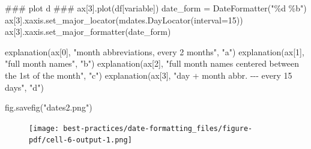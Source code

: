 \documentclass[
  letterpaper,
  DIV=11,
  numbers=noendperiod,
  oneside]{scrreprt}
\newenvironment{Shaded}{\begin{snugshade}}{\end{snugshade}}
\newcommand{\AlertTok}[1]{\textcolor[rgb]{0.68,0.00,0.00}{#1}}
\newcommand{\CommentTok}[1]{\textcolor[rgb]{0.37,0.37,0.37}{#1}}
\newcommand{\DecValTok}[1]{\textcolor[rgb]{0.68,0.00,0.00}{#1}}
\newcommand{\NormalTok}[1]{\textcolor[rgb]{0.00,0.23,0.31}{#1}}
\newcommand{\OperatorTok}[1]{\textcolor[rgb]{0.37,0.37,0.37}{#1}}
\newcommand{\SpecialCharTok}[1]{\textcolor[rgb]{0.37,0.37,0.37}{#1}}
\newcommand{\StringTok}[1]{\textcolor[rgb]{0.13,0.47,0.30}{#1}}
\begin{document}
\begin{Shaded}
\begin{Highlighting}[]
\CommentTok{\#\#\# plot d }\AlertTok{\#\#\#}
\NormalTok{ax[}\DecValTok{3}\NormalTok{].plot(df[}\StringTok{\textquotesingle{}variable\textquotesingle{}}\NormalTok{])}
\NormalTok{date\_form }\OperatorTok{=}\NormalTok{ DateFormatter(}\StringTok{"}\SpecialCharTok{\%d}\StringTok{ \%b"}\NormalTok{)}
\NormalTok{ax[}\DecValTok{3}\NormalTok{].xaxis.set\_major\_locator(mdates.DayLocator(interval}\OperatorTok{=}\DecValTok{15}\NormalTok{))}
\NormalTok{ax[}\DecValTok{3}\NormalTok{].xaxis.set\_major\_formatter(date\_form)}

\NormalTok{explanation(ax[}\DecValTok{0}\NormalTok{], }\StringTok{"month abbreviations, every 2 months"}\NormalTok{, }\StringTok{"a"}\NormalTok{)}
\NormalTok{explanation(ax[}\DecValTok{1}\NormalTok{], }\StringTok{"full month names"}\NormalTok{, }\StringTok{"b"}\NormalTok{)}
\NormalTok{explanation(ax[}\DecValTok{2}\NormalTok{], }\StringTok{"full month names centered between the 1st of the month"}\NormalTok{, }\StringTok{"c"}\NormalTok{)}
\NormalTok{explanation(ax[}\DecValTok{3}\NormalTok{], }\StringTok{"day + month abbr. {-}{-}{-} every 15 days"}\NormalTok{, }\StringTok{"d"}\NormalTok{)}

\NormalTok{fig.savefig(}\StringTok{"dates2.png"}\NormalTok{)}
\end{Highlighting}
\end{Shaded}

\begin{figure}[H]

{\centering \texttt{[image: best-practices/date-formatting\_files/figure-pdf/cell-6-output-1.png]}

}

\end{figure}
\end{document}
